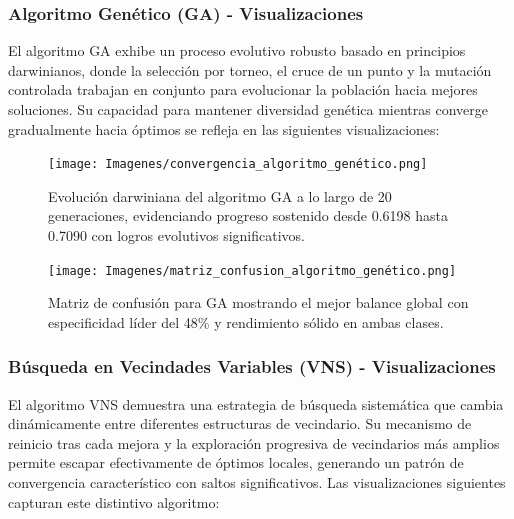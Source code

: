 \newpage

\subsubsection{Algoritmo Genético (GA) - Visualizaciones}

El algoritmo GA exhibe un proceso evolutivo robusto basado en principios darwinianos, donde la selección por torneo, el cruce de un punto y la mutación controlada trabajan en conjunto para evolucionar la población hacia mejores soluciones. Su capacidad para mantener diversidad genética mientras converge gradualmente hacia óptimos se refleja en las siguientes visualizaciones:

\begin{figure}[h!]
    \centering
    \texttt{[image: Imagenes/convergencia\_algoritmo\_genético.png]}
    \caption{Evolución darwiniana del algoritmo GA a lo largo de 20 generaciones, evidenciando progreso sostenido desde 0.6198 hasta 0.7090 con logros evolutivos significativos.}
    \label{fig:convergencia_ga}
\end{figure}

\begin{figure}[h!]
    \centering
    \texttt{[image: Imagenes/matriz\_confusion\_algoritmo\_genético.png]}
    \caption{Matriz de confusión para GA mostrando el mejor balance global con especificidad líder del 48\% y rendimiento sólido en ambas clases.}
    \label{fig:matriz_ga}
\end{figure}

\newpage

\subsubsection{Búsqueda en Vecindades Variables (VNS) - Visualizaciones}

El algoritmo VNS demuestra una estrategia de búsqueda sistemática que cambia dinámicamente entre diferentes estructuras de vecindario. Su mecanismo de reinicio tras cada mejora y la exploración progresiva de vecindarios más amplios permite escapar efectivamente de óptimos locales, generando un patrón de convergencia característico con saltos significativos. Las visualizaciones siguientes capturan este distintivo algoritmo:

